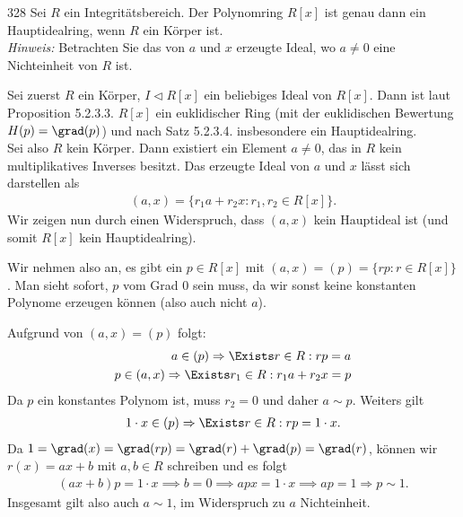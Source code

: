 \begin{algebraUE}{328}
Sei $R$ ein Integritätsbereich. Der Polynomring $R[x]$ ist genau dann ein
Hauptidealring, wenn $R$ ein Körper ist. \\
\textit{Hinweis:} Betrachten Sie das von $a$ und $x$ erzeugte Ideal, wo $a \neq 0$
eine Nichteinheit von $R$ ist.
\end{algebraUE}
\begin{solution}
Sei zuerst $R$ ein Körper, $I \vartriangleleft R[x]$ ein beliebiges Ideal von $R[x]$.
Dann ist laut Proposition 5.2.3.3. $R[x]$ ein euklidischer Ring (mit der euklidischen
Bewertung $H(p) = \grad(p)$) und nach Satz 5.2.3.4.
insbesondere ein Hauptidealring. \\
Sei also $R$ kein Körper. Dann existiert ein Element $a \neq 0$, das in $R$ kein
multiplikatives Inverses besitzt. Das erzeugte Ideal von $a$ und $x$ lässt sich darstellen als
\begin{align*}
  (a,x) = \{r_1a + r_2x: r_1,r_2 \in R[x]\}.
\end{align*}
Wir zeigen nun durch einen Widerspruch, dass $(a,x)$ kein Hauptideal ist (und somit $R[x]$ kein Hauptidealring).

Wir nehmen also an, es gibt ein $p \in R[x]$ mit $(a,x) = (p) = \{rp: r \in R[x]\}$. Man sieht sofort, $p$ vom Grad $0$ sein muss, da wir sonst keine konstanten Polynome erzeugen können (also auch nicht $a$).

Aufgrund von $(a,x)=(p)$ folgt:
\begin{align*}
  a \in (p) \Rightarrow \Exists r \in R: rp = a \\
  p \in (a,x) \Rightarrow \Exists r_1 \in R: r_1 a + r_2 x = p
\end{align*}
Da $p$ ein konstantes Polynom ist, muss $r_2 = 0$ und daher $a \sim p$. Weiters gilt
\begin{align*}
  1\cdot x \in (p) \Rightarrow \Exists r \in R: rp = 1\cdot x.
\end{align*}
Da $1 = \grad(x) = \grad(rp) = \grad(r) + \grad(p) = \grad(r)$, können wir
$r(x) = ax + b$ mit $a,b \in R$ schreiben und es folgt
\begin{align*}
(ax+ b)p = 1\cdot x \implies b = 0 \implies apx = 1\cdot x \implies ap = 1
  \Rightarrow p \sim 1.
\end{align*}
Insgesamt gilt also auch $a \sim 1$, im Widerspruch zu $a$ Nichteinheit.
\end{solution}
